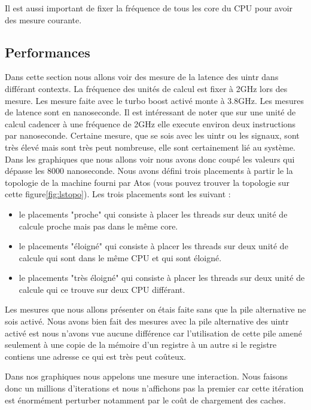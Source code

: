 Il est aussi important de fixer la fréquence de tous les core du CPU pour avoir des mesure courante.

\subsection{Performances}
\label{sec:performance}

Dans cette section nous allons voir des mesure de la latence des uintr dans différant contexts.
La fréquence des unités de calcul est fixer à 2GHz lors des mesure.
Les mesure faite avec le turbo boost activé monte à 3.8GHz.
Les mesures de latence sont en nanoseconde.
Il est intéressant de noter que sur une unité de calcul cadencer à une fréquence de 2GHz elle execute environ deux instructions par nanoseconde. %
Certaine mesure, que se sois avec les uintr ou les signaux, sont très élevé mais sont très peut nombreuse, elle sont certainement lié au système.
Dans les graphiques que nous allons voir nous avons donc coupé les valeurs qui dépasse les 8000 nanoseconde.
Nous avons défini trois placements à partir le la topologie de la machine fourni par Atos (vous pouvez trouver la topologie sur cette figure\ref{fig:lstopo}).
Les trois placements sont les suivant :
\begin{itemize}
  \item le placements "proche" qui consiste à placer les threads sur deux unité de calcule proche mais pas dans le même core.
  \item le placements "éloigné" qui consiste à placer les threads sur deux unité de calcule qui sont dans le même CPU et qui sont éloigné.
  \item le placements "très éloigné" qui consiste à placer les threads sur deux unité de calcule qui ce trouve sur deux CPU différant.
\end{itemize}

Les mesures que nous allons présenter on étais faite sans que la pile alternative ne sois activé.
Nous avons bien fait des mesures avec la pile alternative des uintr activé est nous n'avons vue aucune différence car l'utilisation de cette pile
amené seulement à une copie de la mémoire d'un registre à un autre si le registre contiens une adresse ce qui est très peut coûteux.

Dans nos graphiques nous appelons une mesure une interaction.
Nous faisons donc un millions d'iterations et nous n'affichons pas la premier car cette itération est énormément perturber notamment par le coût de chargement des caches.

